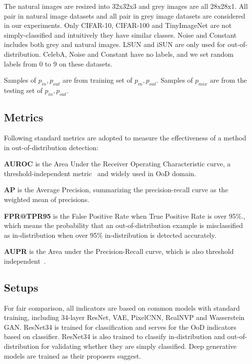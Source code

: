 \documentclass[letterpaper]{article} %
\newcommand{\pin}{p_{in}}
\newcommand{\pout}{p_{out}}
\newcommand{\pmix}{p_{mix}}
\begin{document}
The natural images are resized into 32x32x3 and grey images are all 28x28x1. All pair in natural image datasets and all pair in grey image datasets are considered in our experiments. Only CIFAR-10, CIFAR-100 and TinyImageNet are not simply-classified and intuitively they have similar classes. Noise and Constant includes both grey and natural images. LSUN and iSUN are only used for out-of-distribution. CelebA, Noise and Constant have no labels, and we set random labels from 0 to 9 on these datasets. 

Samples of $\pin, \pout$ are from training set of $\pin, \pout$. Samples of $\pmix$ are from the testing set of $\pin, \pout$. 

\subsection{Metrics}
Following standard metrics are adopted to measure the effectiveness of a method in out-of-distribution detection:

\noindent \textbf{AUROC} is the Area Under the Receiver Operating Characteristic curve, a threshold-independent metric~\cite{davis2006relationship} and widely used in OoD domain. 


\noindent \textbf{AP} is the Average Precision, summarizing the precision-recall curve as the weighted mean of precisions. 

\noindent \textbf{FPR@TPR95} is the False Positive Rate when True Positive Rate is over 95\%., which means the probability that an out-of-distribution example is misclassified as in-distribution when over 95\% in-distribution is detected accurately.

\noindent \textbf{AUPR} is the Area under the Precision-Recall curve, which is also threshold independent~\cite{saito2015precision}. %


\subsection{Setups} 
For fair comparison, all indicators are based on common models with standard training, including 34-layer ResNet, VAE, PixelCNN, RealNVP and Wasserstein GAN. ResNet34 is trained for classification and serves for the OoD indicators based on classifier. ResNet34 is also trained to classify in-distribution and out-of-distribution for validating whether they are simply classified. Deep generative models are trained as their proposers suggest. 
\end{document}
